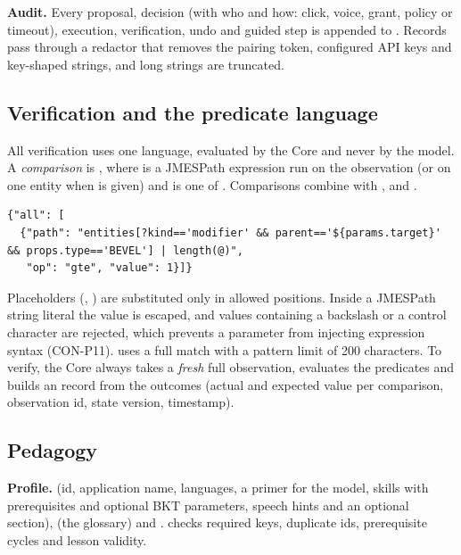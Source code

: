 \textbf{Audit.} Every proposal, decision (with who and how: click, voice, grant, policy or timeout), execution, verification, undo and guided step is appended to . Records pass through a redactor that removes the pairing token, configured API keys and key-shaped strings, and long strings are truncated.

\subsection{Verification and the predicate language}

All verification uses one language, evaluated by the Core and never by the model. A \emph{comparison} is , where  is a JMESPath expression run on the observation (or on one entity when  is given) and  is one of . Comparisons combine with ,  and .

\begin{lstlisting}[language={}]
{"all": [
  {"path": "entities[?kind=='modifier' && parent=='${params.target}' && props.type=='BEVEL'] | length(@)",
   "op": "gte", "value": 1}]}
\end{lstlisting}

Placeholders (, ) are substituted only in allowed positions. Inside a JMESPath string literal the value is escaped, and values containing a backslash or a control character are rejected, which prevents a parameter from injecting expression syntax (CON-P11).  uses a full match with a pattern limit of 200 characters. To verify, the Core always takes a \emph{fresh} full observation, evaluates the predicates and builds an  record from the outcomes (actual and expected value per comparison, observation id, state version, timestamp).

\subsection{Pedagogy}

\textbf{Profile.}  (id, application name, languages, a primer for the model, skills with prerequisites and optional BKT parameters, speech hints and an optional  section),  (the glossary) and .  checks required keys, duplicate ids, prerequisite cycles and lesson validity.

